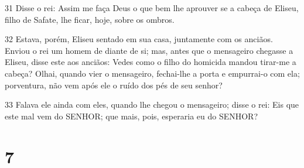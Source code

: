 \par 31 Disse o rei: Assim me faça Deus o que bem lhe aprouver se a cabeça de Eliseu, filho de Safate, lhe ficar, hoje, sobre os ombros.
\par 32 Estava, porém, Eliseu sentado em sua casa, juntamente com os anciãos. Enviou o rei um homem de diante de si; mas, antes que o mensageiro chegasse a Eliseu, disse este aos anciãos: Vedes como o filho do homicida mandou tirar-me a cabeça? Olhai, quando vier o mensageiro, fechai-lhe a porta e empurrai-o com ela; porventura, não vem após ele o ruído dos pés de seu senhor?
\par 33 Falava ele ainda com eles, quando lhe chegou o mensageiro; disse o rei: Eis que este mal vem do SENHOR; que mais, pois, esperaria eu do SENHOR?

\chapter{7}

